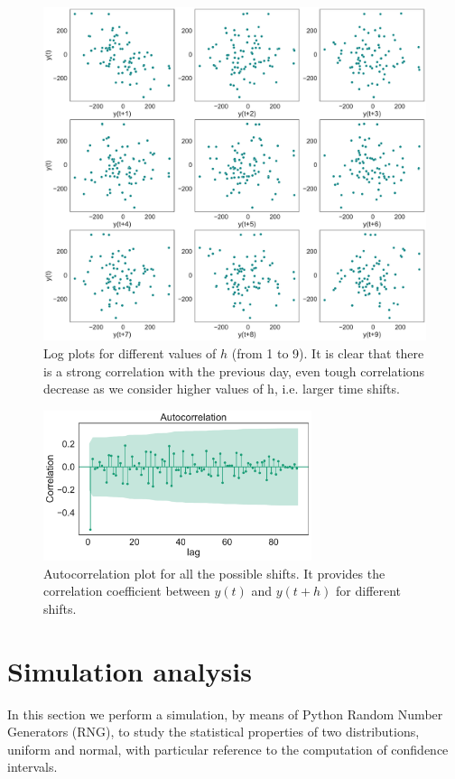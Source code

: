 \documentclass[twoside,onecolumn]{article}
\theoremstyle{definition}
\begin{document}
\begin{figure} \centering
\includegraphics[width=1\textwidth]{../figs/joe_lag_plots.pdf}
\caption{Log plots for different values of $h$ (from 1 to 9). It is clear that there is a strong correlation with the previous day, even tough correlations decrease as we consider higher values of h, i.e. larger time shifts.}\label{fig:joe_lag_plots}
\end{figure}

\begin{figure}\centering
\includegraphics[width=0.7\textwidth]{../figs/joe_autocorr.pdf}
\caption{Autocorrelation plot for all the possible shifts. It provides the correlation coefficient between $y(t)$ and $y(t+h)$ for different shifts.}\label{fig:joe_autocorr}
\end{figure}



\section{Simulation analysis}
In this section we perform a simulation, by means of Python Random Number Generators (RNG), to study the statistical properties of two distributions, uniform and normal, with particular reference to the computation of confidence intervals.
\end{document}
